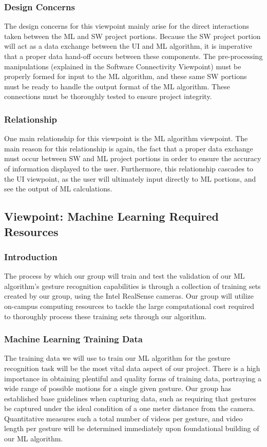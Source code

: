 \documentclass[onecolumn, draftclsnofoot,10pt, compsoc]{IEEEtran}
\begin{document}
\subsubsection{Design Concerns}
The design concerns for this viewpoint mainly arise for the direct interactions taken between the ML and SW project portions. Because the SW project portion will act as a data exchange between the UI and ML algorithm, it is imperative that a proper data hand-off occurs between these components. The pre-processing manipulations (explained in the Software Connectivity Viewpoint) must be properly formed for input to the ML algorithm, and these same SW portions must be ready to handle the output format of the ML algorithm. These connections must be thoroughly tested to ensure project integrity.
\subsubsection{Relationship}
One main relationship for this viewpoint is the ML algorithm viewpoint. The main reason for this relationship is again, the fact that a proper data exchange must occur between SW and ML project portions in order to ensure the accuracy of information displayed to the user. Furthermore, this relationship cascades to the UI viewpoint, as the user will ultimately input directly to ML portions, and see the output of ML calculations.

\subsection{Viewpoint: Machine Learning Required Resources}
\subsubsection{Introduction}
The process by which our group will train and test the validation of our ML algorithm's gesture recognition capabilities is through a collection of training sets created by our group, using the Intel RealSense cameras. Our group will utilize on-campus computing resources to tackle the large computational cost required to thoroughly process these training sets through our algorithm.
\subsubsection{Machine Learning Training Data}
The training data we will use to train our ML algorithm for the gesture recognition task will be the most vital data aspect of our project. There is a high importance in obtaining plentiful and quality forms of training data, portraying a wide range of possible motions for a single given gesture. Our group has established base guidelines when capturing data, such as requiring that gestures be captured under the ideal condition of a one meter distance from the camera. Quantitative measures such a total number of videos per gesture, and video length per gesture will be determined immediately upon foundational building of our ML algorithm.
\end{document}
